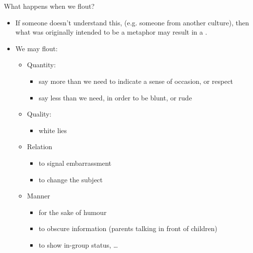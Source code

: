 \documentclass{beamer}
\begin{document}
\begin{frame}{What happens when we flout?}
\begin{itemize}
\item If someone doesn't understand this, (e.g. someone from another
  culture), then what was originally intended to be a metaphor may
  result in a .
\item We may flout: 
  \begin{itemize}
\item Quantity: 
  \begin{itemize}
  \item say  more than we need to indicate a sense of occasion, or respect
  \item  say less than we need, in order to be blunt, or rude
  \end{itemize}
\item Quality: 
  \begin{itemize}
  \item white lies
  \end{itemize}
\item Relation  
  \begin{itemize}
  \item to signal embarrassment
  \item to change the subject
  \end{itemize}
\item Manner
  \begin{itemize}
  \item for the   sake of humour
  \item to obscure information (parents talking in front of children)
  \item to show in-group status,  \ldots
  \end{itemize}
\end{itemize}
\end{itemize}


\end{frame}
\end{document}
